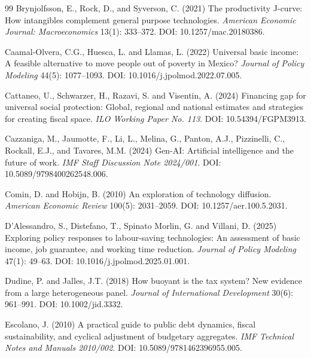 \documentclass[11pt,a4paper]{article}
\begin{document}
\begin{thebibliography}{99}
Brynjolfsson, E., Rock, D., and Syverson, C. (2021)
\newblock The productivity J-curve: How intangibles complement general purpose technologies.
\newblock \emph{American Economic Journal: Macroeconomics} 13(1): 333--372. DOI: 10.1257/mac.20180386.

Caamal-Olvera, C.G., Huesca, L. and Llamas, L. (2022)
\newblock Universal basic income: A feasible alternative to move people out of poverty in Mexico?
\newblock \emph{Journal of Policy Modeling} 44(5): 1077--1093. DOI: 10.1016/j.jpolmod.2022.07.005.

Cattaneo, U., Schwarzer, H., Razavi, S. and Visentin, A. (2024)
\newblock Financing gap for universal social protection: Global, regional and national estimates and strategies for creating fiscal space.
\newblock \emph{ILO Working Paper No. 113}. DOI: 10.54394/FGPM3913.

Cazzaniga, M., Jaumotte, F., Li, L., Melina, G., Panton, A.J., Pizzinelli, C., Rockall, E.J., and Tavares, M.M. (2024)
\newblock Gen-AI: Artificial intelligence and the future of work.
\newblock \emph{IMF Staff Discussion Note 2024/001}. DOI: 10.5089/9798400262548.006.

Comin, D. and Hobijn, B. (2010)
\newblock An exploration of technology diffusion.
\newblock \emph{American Economic Review} 100(5): 2031--2059. DOI: 10.1257/aer.100.5.2031.

D'Alessandro, S., Distefano, T., Spinato Morlin, G. and Villani, D. (2025)
\newblock Exploring policy responses to labour-saving technologies: An assessment of basic income, job guarantee, and working time reduction.
\newblock \emph{Journal of Policy Modeling} 47(1): 49--63. DOI: 10.1016/j.jpolmod.2025.01.001.

Dudine, P. and Jalles, J.T. (2018)
\newblock How buoyant is the tax system? New evidence from a large heterogeneous panel.
\newblock \emph{Journal of International Development} 30(6): 961--991. DOI: 10.1002/jid.3332.

Escolano, J. (2010)
\newblock A practical guide to public debt dynamics, fiscal sustainability, and cyclical adjustment of budgetary aggregates.
\newblock \emph{IMF Technical Notes and Manuals 2010/002}. DOI: 10.5089/9781462396955.005.


\end{thebibliography}
\end{document}
